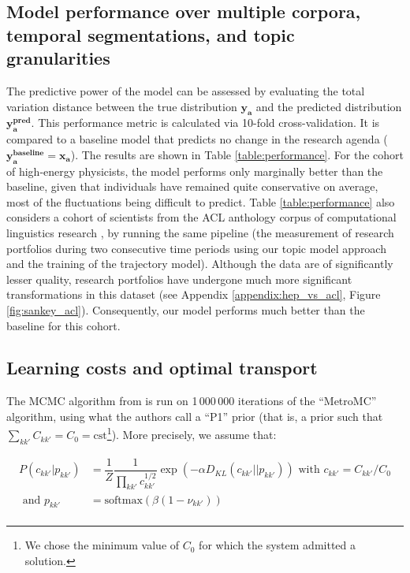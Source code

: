 \documentclass{article}
\begin{document}
\subsection{\label{appendix:model-performance}Model performance over multiple corpora, temporal segmentations, and topic granularities}

The predictive power of the model can be assessed by evaluating the total variation distance between the true distribution $\bm{y_a}$ and the predicted distribution $\bm{y_a^{\text{pred}}}$. This performance metric is calculated via 10-fold cross-validation. It is compared  to a baseline model that predicts no change in the research agenda ($\bm{y_a^{\text{baseline}}}=\bm{x_a}$). The results are shown in Table \ref{table:performance}. For the cohort of high-energy physicists, the model performs only marginally better than the baseline, given that individuals have remained quite conservative on average, most of the fluctuations being difficult to predict. Table \ref{table:performance} also considers a cohort of scientists from the ACL anthology corpus  of computational linguistics research \citep{acl_anthology_corpus}, by running the same pipeline (the measurement of research portfolios during two consecutive time periods using our topic model approach and the training of the trajectory model). Although the data are of significantly lesser quality, research portfolios have undergone much more significant transformations in this dataset (see Appendix \ref{appendix:hep_vs_acl}, Figure \ref{fig:sankey_acl}). Consequently, our model performs much better than the baseline for this cohort.



\subsection{\label{appendix:optimal_transport}Learning costs and optimal transport}

The MCMC algorithm from \citealt{pmlr-v162-chiu22b} is run on 1\,000\,000 iterations of the ``MetroMC'' algorithm, using what the authors call a ``P1'' prior (that is, a prior such that $\sum_{kk'}C_{kk'}=C_0=\mathrm{cst}$\footnote{We chose the minimum value of $C_0$ for which the system admitted a solution.}). More precisely, we assume that:

\begin{align}
    P(c_{kk'}|p_{kk'}) &= \dfrac{1}{Z}\dfrac{1}{\displaystyle\prod_{kk'} c_{kk'}^{1/2}} \exp{\left(-\alpha D_{KL}(c_{kk'}||p_{kk'})\right)} \text{ with } c_{kk'} = C_{kk'}/C_0\label{eq:entropic}\\
    \text{ and } p_{kk'} &= \mathrm{softmax}(\beta (1-\nu_{kk'}))\\
\end{align}
\end{document}
